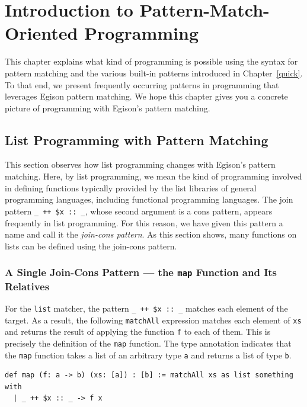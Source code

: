 \chapter{Introduction to Pattern-Match-Oriented Programming}\label{pmo}

This chapter explains what kind of programming is possible using the syntax for pattern matching and the various built-in patterns introduced in Chapter~\ref{quick}.
To that end, we present frequently occurring patterns in programming that leverages Egison pattern matching.
We hope this chapter gives you a concrete picture of programming with Egison's pattern matching.

\section{List Programming with Pattern Matching}

This section observes how list programming changes with Egison's pattern matching.
Here, by list programming, we mean the kind of programming involved in defining functions typically provided by the list libraries of general programming languages, including functional programming languages.
The join pattern \lstinline{_ ++ $x :: _}, whose second argument is a cons pattern, appears frequently in list programming.
For this reason, we have given this pattern a name and call it the \emph{join-cons pattern}.
As this section shows, many functions on lists can be defined using the join-cons pattern.

\subsection{A Single Join-Cons Pattern --- the \texttt{map} Function and Its Relatives}

For the \lstinline{list} matcher, the pattern \lstinline|_ ++ $x :: _| matches each element of the target.
As a result, the following \lstinline{matchAll} expression matches each element of \lstinline{xs} and returns the result of applying the function \lstinline{f} to each of them.
This is precisely the definition of the \lstinline{map} function.
The type annotation indicates that the \lstinline{map} function takes a list of an arbitrary type \lstinline{a} and returns a list of type \lstinline{b}.

\begin{lstlisting}[language=egison,numbers=none]
def map (f: a -> b) (xs: [a]) : [b] := matchAll xs as list something with
  | _ ++ $x :: _ -> f x
\end{lstlisting}

